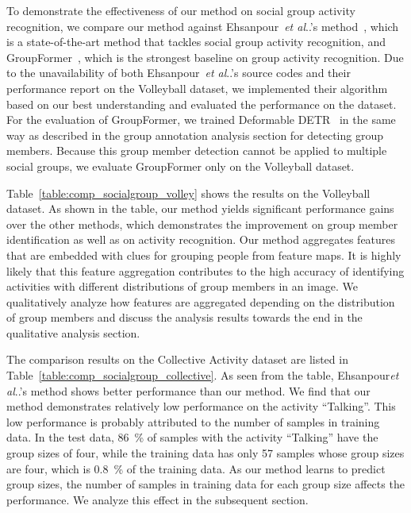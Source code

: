 \documentclass[runningheads]{llncs}
\makeatletter
\DeclareRobustCommand\onedot{\futurelet\@let@token\@onedot}
\def\@onedot{\ifx\@let@token.\else.\null\fi\xspace}
\def\etal{\emph{et al}\onedot}
\makeatother
\begin{document}
To demonstrate the effectiveness of our method on social group activity recognition, we compare our method against Ehsanpour~\etal's method~\cite{ehsanpour_eccv2020}, which is a state-of-the-art method that tackles social group activity recognition, and GroupFormer~\cite{li_iccv2021}, which is the strongest baseline on group activity recognition. Due to the unavailability of both Ehsanpour~\etal's source codes and their performance report on the Volleyball dataset, we implemented their algorithm based on our best understanding and evaluated the performance on the dataset. For the evaluation of GroupFormer, we trained Deformable DETR~\cite{zhu_iclr2021} in the same way as described in the group annotation analysis section for detecting group members. Because this group member detection cannot be applied to multiple social groups, we evaluate GroupFormer only on the Volleyball dataset.

Table~\ref{table:comp_socialgroup_volley} shows the results on the Volleyball dataset. As shown in the table, our method yields significant performance gains over the other methods, which demonstrates the improvement on group member identification as well as on activity recognition. Our method aggregates features that are embedded with clues for grouping people from feature maps. It is highly likely that this feature aggregation contributes to the high accuracy of identifying activities with different distributions of group members in an image. We qualitatively analyze how features are aggregated depending on the distribution of group members and discuss the analysis results towards the end in the qualitative analysis section.

The comparison results on the Collective Activity dataset are listed in Table~\ref{table:comp_socialgroup_collective}. As seen from the table, Ehsanpour\etal's method shows better performance than our method. We find that our method demonstrates relatively low performance on the activity ``Talking''. This low performance is probably attributed to the number of samples in training data. In the test data, \SI{86}{\percent} of samples with the activity ``Talking'' have the group sizes of four, while the training data has only 57 samples whose group sizes are four, which is \SI{0.8}{\percent} of the training data. As our method learns to predict group sizes, the number of samples in training data for each group size affects the performance. We analyze this effect in the subsequent section.
\end{document}
